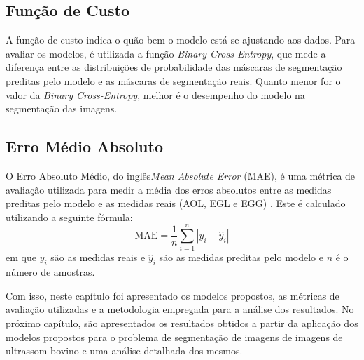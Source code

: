 \subsection{Função de Custo}

A função de custo indica o quão bem o modelo está se ajustando aos dados. Para avaliar os modelos, é utilizada a função \textit{Binary Cross-Entropy}, que mede a diferença entre as distribuições de probabilidade das máscaras de segmentação preditas pelo modelo e as máscaras de segmentação reais. Quanto menor for o valor da \textit{Binary Cross-Entropy}, melhor é o desempenho do modelo na segmentação das imagens.


\subsection{Erro Médio Absoluto}

O Erro Absoluto Médio, do inglês\textit{Mean Absolute Error} (MAE), é uma métrica de avaliação utilizada para medir a média dos erros absolutos entre as medidas preditas pelo modelo e as medidas reais (AOL, EGL e EGG) \cite{JadersonMelo2022UNetpp}. Este é calculado utilizando a seguinte fórmula:
\begin{equation}        
    \text{MAE} = \frac{1}{n} \sum_{i=1}^{n} |y_i - \hat{y}_i|
\end{equation}
em que $y_i$ são as medidas reais e $\hat{y}_i$ são as medidas preditas pelo modelo e $n$ é o número de amostras.


Com isso, neste capítulo foi apresentado os modelos propostos, as métricas de avaliação utilizadas e a metodologia empregada para a análise dos resultados. No próximo capítulo, são apresentados os resultados obtidos a partir da aplicação dos modelos propostos para o problema de segmentação de imagens de imagens de ultrassom bovino e uma análise detalhada dos mesmos.